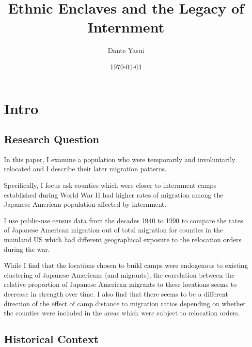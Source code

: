\documentclass[12pt]{article}
\title{Ethnic Enclaves and the Legacy of Internment}
\author{Dante Yasui}
\date{\today}
\begin{document}


\maketitle

\section{Intro}\label{intro}

\subsection{Research Question}\label{research-question}

In this paper, I examine a population who were temporarily and involuntarily
relocated  and I describe their later migration patterns.

Specifically, I focus ask counties which were closer to internment camps
established during World War II had higher rates of migration among the Japanese
American population affected by internment.

I use public-use census data from the decades 1940 to 1990 to compare the rates
of Japanese American migration out of total migration for counties in the
mainland US which had different geographical exposure to the relocation orders
during the war.

While I find that the locations chosen to build camps were endogenous to
existing clustering of Japanese Americans (and migrants), the correlation
between the relative proportion of Japanese American migrants to these locations
seems to decrease in strength over time. I also find that there seems to be a
different direction of the effect of camp distance to migration ratios depending
on whether the counties were included in the areas which were subject to
relocation orders.

\subsection{Historical Context}\label{history}
\end{document}
